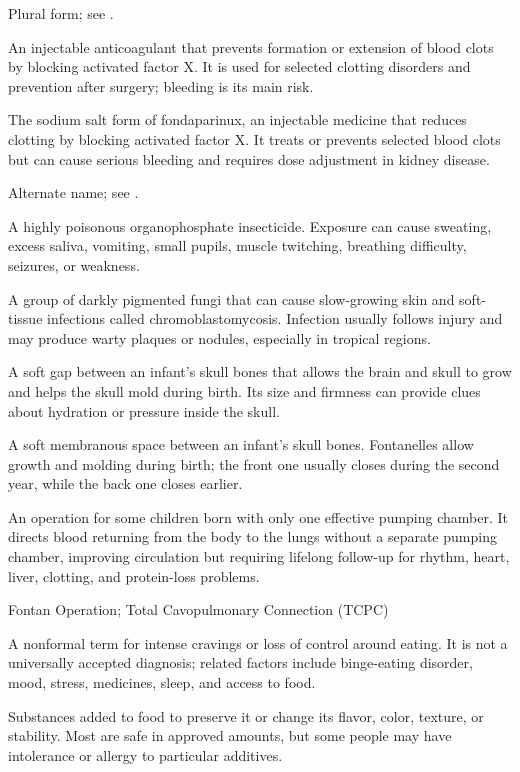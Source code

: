  Plural form; see .

 An injectable anticoagulant that prevents formation or extension of blood clots by blocking activated factor X. It is used for selected clotting disorders and prevention after surgery; bleeding is its main risk.

 The sodium salt form of fondaparinux, an injectable medicine that reduces clotting by blocking activated factor X. It treats or prevents selected blood clots but can cause serious bleeding and requires dose adjustment in kidney disease.

 Alternate name; see .

 A highly poisonous organophosphate insecticide. Exposure can cause sweating, excess saliva, vomiting, small pupils, muscle twitching, breathing difficulty, seizures, or weakness.

 A group of darkly pigmented fungi that can cause slow-growing skin and soft-tissue infections called chromoblastomycosis. Infection usually follows injury and may produce warty plaques or nodules, especially in tropical regions.

 A soft gap between an infant’s skull bones that allows the brain and skull to grow and helps the skull mold during birth. Its size and firmness can provide clues about hydration or pressure inside the skull.

 A soft membranous space between an infant’s skull bones. Fontanelles allow growth and molding during birth; the front one usually closes during the second year, while the back one closes earlier.

 An operation for some children born with only one effective pumping chamber. It directs blood returning from the body to the lungs without a separate pumping chamber, improving circulation but requiring lifelong follow-up for rhythm, heart, liver, clotting, and protein-loss problems.

\synonyms
Fontan Operation; Total Cavopulmonary Connection (TCPC)

 A nonformal term for intense cravings or loss of control around eating. It is not a universally accepted diagnosis; related factors include binge-eating disorder, mood, stress, medicines, sleep, and access to food.

 Substances added to food to preserve it or change its flavor, color, texture, or stability. Most are safe in approved amounts, but some people may have intolerance or allergy to particular additives.

